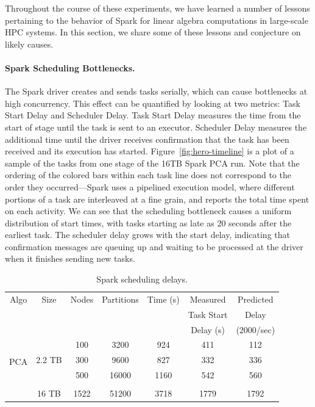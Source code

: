 Throughout the course of these experiments, we have learned a number of lessons pertaining to the behavior of Spark for linear algebra computations in large-scale HPC systems. 
In this section, we share some of these lessons and conjecture on likely causes.

\paragraph{Spark Scheduling Bottlenecks.}
The Spark driver creates and sends tasks serially, which can cause bottlenecks at high concurrency.  This effect can be quantified by looking at two metrics: Task Start Delay and Scheduler Delay. Task Start Delay measures the time from the start of stage until the task is sent to an executor. Scheduler Delay measures the additional time until the driver receives confirmation that the task has been received and its execution has started. Figure~\ref{fig:hero-timeline} is a plot of a sample of the tasks from one stage of the 16TB Spark PCA run. Note that the ordering of the colored bars within each task line does not correspond to the order they occurred---Spark uses a pipelined execution model, where different portions of a task are interleaved at a fine grain, and reports the total time spent on each activity.  We can see that the scheduling bottleneck causes a uniform distribution of start times, with tasks starting as late as 20 seconds after the earliest task.  The scheduler delay grows with the start delay, indicating that confirmation messages are queuing up and waiting to be processed at the driver when it finishes sending new tasks.

\begin{table}[th]
\centering
\begin{tabular}{| c | c | c | c | c | c | c |}
\hline
Algo & Size & Nodes & Partitions & Time (s) & Measured & Predicted \\
{} & {} & {} & {} & {} & Task Start & Delay \\
{} & {} & {} & {} & {} & Delay (s) & (2000/sec) \\
\hline
\multirow{4}{*}{PCA} & \multirow{3}{*}{2.2 TB} & 100 & 3200 & 924 & 411 & 112 \\
 {} & {} & 300 & 9600 & 827 & 332 & 336 \\
 {} & {} & 500 & 16000 & 1160 & 542 & 560 \\ \cline{2-7} & & & & & & \\[-1ex]
 {} & {16 TB} & 1522 & 51200 & 3718 & 1779 & 1792 \\
 \hline
\end{tabular}
\caption{Spark scheduling delays.}
\label{tab:scheduling}
\end{table}

